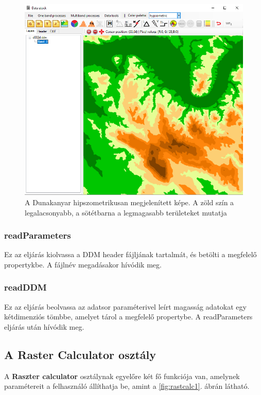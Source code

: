 \documentclass[a4paper,12pt]{article}
\begin{document}
\begin{figure}
	\centering
	\includegraphics[width=14cm]{hipszo.png}
	\caption{A Dunakanyar hipszometrikusan megjelenített képe. A zöld szín a legalacsonyabb, a sötétbarna a legmagasabb területeket mutatja}
	\label{fig:hipszo}
\end{figure} 

\subsubsection{readParameters}

Ez az eljárás kiolvassa a DDM header fájljának tartalmát, és betölti a megfelelő propertykbe. A fájlnév megadásakor hívódik meg.

\subsubsection{readDDM}

Ez az eljárás beolvassa az adatsor paraméterivel leírt magasság adatokat egy kétdimenziós tömbbe, amelyet tárol a megfelelő propertybe. A readParameters eljárás után hívódik meg.

\subsection{A \textbf{Raster Calculator} osztály}

A \textbf{Raszter calculator} osztálynak egyelőre két fő funkciója van, amelynek paramétereit a felhasználó állíthatja be, amint a \ref{fig:rastcalc1}. ábrán látható.
\end{document}
